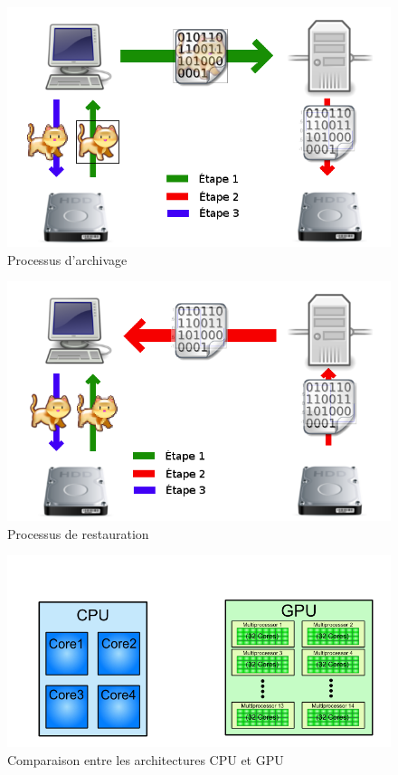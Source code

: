 \documentclass{article}
\begin{document}
\begin{figure}[!h]
\centering
\includegraphics[scale=0.5]{images/save.png}
\caption{Processus d'archivage}
\label{save}
\end{figure}

\begin{figure}[!h]
\centering
\includegraphics[scale=0.5]{images/load.png}
\caption{Processus de restauration}
\label{load}
\end{figure}

\begin{figure}[!h]
\centering
\includegraphics[scale=0.5]{images/cpugpu.png}
\caption{Comparaison entre les architectures CPU et GPU}
\label{cpugpu}
\end{figure}
\end{document}
